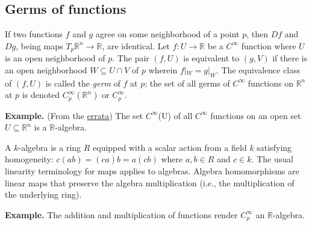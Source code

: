 \documentclass[a4paper]{article}
\newcommand{\R}{\mathbb{R}}
\begin{document}
\subsection{Germs of functions}

If two functions $f$ and $g$ agree on some neighborhood of a point $p$, then $Df$ and $Dg$, being maps $T_p\R^n \to \R$, are identical. Let $f : U \to \R$ be a $C^\infty$ function where $U$ is an open neighborhood of $p$. The pair $(f, U)$ is equivalent to $(g, V)$ if there is an open neighborhood $W \subseteq U \cap V$ of $p$ wherein $f|_W = g|_W$. The equivalence class of $(f, U)$ is called the \emph{germ} of $f$ at $p$; the set of all germs of $C^\infty$ functions on $\R^n$ at $p$ is denoted $C_p^\infty(\R^n)$ or $C_p^\infty$.

\textbf{Example.} (From the \href{https://ltu.pages.tufts.edu/doc/mf2_master_errata2.pdf}{errata}) The set $C^\infty$(U) of all $C^\infty$ functions on an open set $U \subseteq \R^n$ is a $\R$-algebra.

A $k$-algebra is a ring $R$ equipped with a scalar action from a field $k$ satisfying homogeneity: $c(ab) = (ca)b = a(cb)$ where $a, b \in R$ and $c \in k$. The usual linearity terminology for maps applies to algebras. Algebra homomorphisms are linear maps that preserve the algebra multiplication (i.e., the multiplication of the underlying ring).

\textbf{Example.} The addition and multiplication of functions render $C_p^\infty$ an $\R$-algebra.
\end{document}
